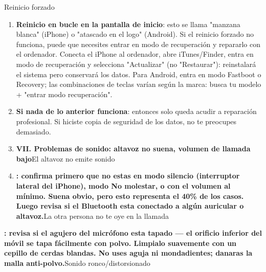 


Reinicio forzado


\begin{enumerate}
  \item \textbf{Reinicio en bucle en la pantalla de inicio}: esto se llama "manzana blanca" (iPhone) o "atascado en el logo" (Android). Si el reinicio forzado no funciona, puede que necesites entrar en modo de recuperación y repararlo con el ordenador. Conecta el iPhone al ordenador, abre iTunes/Finder, entra en modo de recuperación y selecciona "Actualizar" (no "Restaurar"): reinstalará el sistema pero conservará los datos. Para Android, entra en modo Fastboot o Recovery; las combinaciones de teclas varían según la marca: busca tu modelo + "entrar modo recuperación".
  \item \textbf{Si nada de lo anterior funciona}: entonces solo queda acudir a reparación profesional. Si hiciste copia de seguridad de los datos, no te preocupes demasiado.
  \item \textbf{VII. Problemas de sonido: altavoz no suena, volumen de llamada bajo}El altavoz no emite sonido
  \item \textbf{: confirma primero que no estas en modo silencio (interruptor lateral del iPhone), modo No molestar, o con el volumen al mínimo. Suena obvio, pero esto representa el 40\% de los casos. Luego revisa si el Bluetooth esta conectado a algún auricular o altavoz.}La otra persona no te oye en la llamada
\end{enumerate}

\textbf{: revisa si el agujero del micrófono esta tapado — el orificio inferior del móvil se tapa fácilmente con polvo. Limpialo suavemente con un cepillo de cerdas blandas. No uses aguja ni mondadientes; danaras la malla anti-polvo.}Sonido ronco/distorsionado

